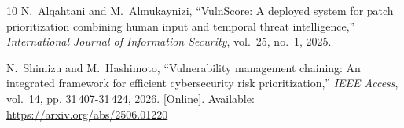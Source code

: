 \documentclass[journal]{IEEEtran}
\begin{document}
\begin{thebibliography}{10}
N.~Alqahtani and M.~Almukaynizi, ``{VulnScore}: A deployed system for patch
  prioritization combining human input and temporal threat intelligence,''
  \emph{International Journal of Information Security}, vol.~25, no.~1, 2025.

\BIBentryALTinterwordspacing
N.~Shimizu and M.~Hashimoto, ``Vulnerability management chaining: An integrated
  framework for efficient cybersecurity risk prioritization,'' \emph{IEEE
  Access}, vol.~14, pp. 31\,407-31\,424, 2026. [Online]. Available:
  \url{https://arxiv.org/abs/2506.01220}
\BIBentrySTDinterwordspacing

\end{thebibliography}
\end{document}
